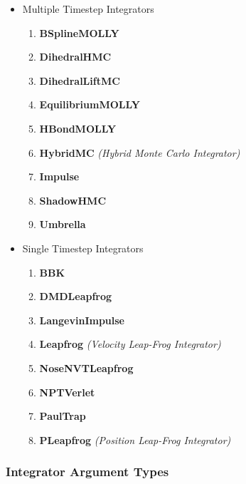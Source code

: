 \documentclass[11pt]{report}
\begin{document}
\begin{itemize}
\item Multiple Timestep Integrators
  \begin{enumerate}
  \item {\bf BSplineMOLLY}
  \item {\bf DihedralHMC}
  \item {\bf DihedralLiftMC}
  \item {\bf EquilibriumMOLLY}
  \item {\bf HBondMOLLY}
  \item {\bf HybridMC} {\it (Hybrid Monte Carlo Integrator)}
  \item {\bf Impulse}
  \item {\bf ShadowHMC}
  \item {\bf Umbrella}
  \end{enumerate}
\item Single Timestep Integrators
  \begin{enumerate}
  \item {\bf BBK} 
  \item {\bf DMDLeapfrog}
  \item {\bf LangevinImpulse}
  \item {\bf Leapfrog }    {\it (Velocity Leap-Frog Integrator)}
  \item {\bf NoseNVTLeapfrog}
  \item {\bf NPTVerlet}
  \item {\bf PaulTrap}
  \item {\bf PLeapfrog }    {\it (Position Leap-Frog Integrator)}
  \end{enumerate}
\end{itemize}

\clearpage
\subsubsection{Integrator Argument Types} 
\end{document}
